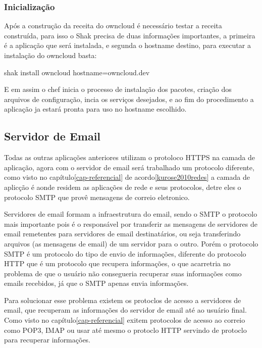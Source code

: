\subsubsection{Inicialização}

Após a construção da receita do owncloud é necessário testar a receita construída,
para isso o Shak precisa de duas informações importantes, a primeira é a aplicação
que será instalada, e segunda o hostname destino, para executar a instalação
do owncloud basta:

\begin{center}
shak install owncloud hostname=owncloud.dev
\end{center}

E em assim o chef inicia o processo de instalação dos pacotes, criação dos arquivos
de configuração, incia os serviços desejados, e ao fim do procedimento a aplicação
ja estará pronta para uso no hostname escolhido.


\subsection{Servidor de Email}
\label{sub:email}

Todas as outras aplicações anteriores utilizam o protoloco
HTTPS na camada de aplicação, agora com o servidor de email será trabalhado um
protocolo diferente, como visto no capítulo\ref{cap-referencial}
de acordo\ref{kurose2010redes} a camada de aplicção é aonde residem  as aplicações
de rede e seus protocolos, detre eles o protocolo SMTP que provê mensagens de correio
eletronico.

Servidores de email formam a infraestrutura do email, sendo o SMTP o protocolo
mais importante pois é o responsável por transferir as mensagens de servidores
de email remetentes para servidores de email destinatários, ou seja transferindo
arquivos (as mensagens de email) de um servidor para o outro. Porém o protocolo
SMTP é um protocolo do tipo de envio de informações, diferente do protocolo HTTP
que é um protocolo que recupera informações, o que acarretria no problema de que
o usuário não consegueria recuperar suas informações como emails recebidos, já
que o SMTP apenas envia informações.

Para solucionar esse problema existem os protoclos de acesso a servidores de
email, que recuperam as informações do servidor de email até ao usuário final.
Como visto no capítulo\ref{cap-referencial} exitem protocolos de acesso ao correio
como POP3, IMAP ou usar até mesmo o protoclo HTTP servindo de protoclo para recuperar
informações.

